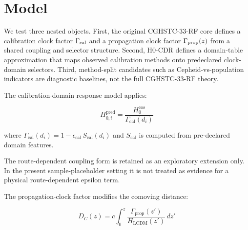 \section{Model}

We test three nested objects. First, the original CGHSTC-33-RF core defines a
calibration clock factor \(\Gamma_{\rm cal}\) and a propagation clock factor
\(\Gamma_{\rm prop}(z)\) from a shared coupling and selector structure. Second,
H0-CDR defines a domain-table approximation that maps observed calibration
methods onto predeclared clock-domain selectors. Third, method-split candidates
such as Cepheid-vs-population indicators are diagnostic baselines, not the full
CGHSTC-33-RF theory.

The calibration-domain response model applies:

\begin{equation}
H_{0,i}^{\text{pred}} = \frac{H_0^{\text{cos}}}{\Gamma_{\text{cal}}(d_i)}
\end{equation}

where $\Gamma_{\text{cal}}(d_i) = 1 - \epsilon_{\text{cal}} \, S_{\text{cal}}(d_i)$
and $S_{\text{cal}}$ is computed from pre-declared domain features.

The route-dependent coupling form is retained as an exploratory extension only.
In the present sample-placeholder setting it is not treated as evidence for a
physical route-dependent epsilon term.

The propagation-clock factor modifies the comoving distance:

\begin{equation}
D_C(z) = c \int_0^z \frac{\Gamma_{\text{prop}}(z')}{H_{\text{LCDM}}(z')} \, dz'
\end{equation}
